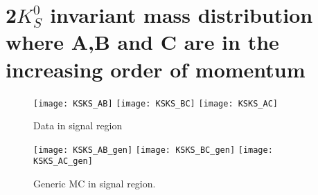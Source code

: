 \chapter{2$K_S^0$ invariant mass distribution where A,B and C are in the increasing order of momentum}
\begin{figure}[htpb]
\begin{minipage}{0.5\linewidth}
\centering
\texttt{[image: KSKS\_AB]}
\texttt{[image: KSKS\_BC]}
\texttt{[image: KSKS\_AC]}
\caption{Data in signal region}
\end{minipage}
\begin{minipage}{0.5\linewidth}
\centering
\texttt{[image: KSKS\_AB\_gen]}
\texttt{[image: KSKS\_BC\_gen]}
\texttt{[image: KSKS\_AC\_gen]}
\caption{Generic MC in signal region.}
\end{minipage}
\end{figure}


